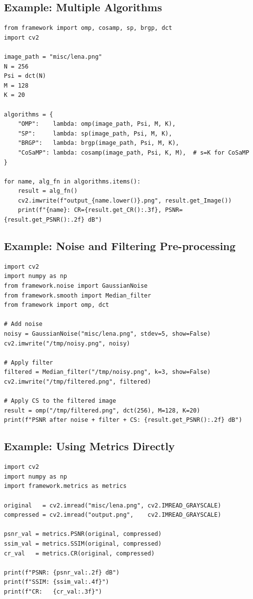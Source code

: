 \documentclass[12pt,a4paper]{article}
\begin{document}
\subsection{Example: Multiple Algorithms}

\begin{lstlisting}[style=python]
from framework import omp, cosamp, sp, brgp, dct
import cv2

image_path = "misc/lena.png"
N = 256
Psi = dct(N)
M = 128
K = 20

algorithms = {
    "OMP":    lambda: omp(image_path, Psi, M, K),
    "SP":     lambda: sp(image_path, Psi, M, K),
    "BRGP":   lambda: brgp(image_path, Psi, M, K),
    "CoSaMP": lambda: cosamp(image_path, Psi, K, M),  # s=K for CoSaMP
}

for name, alg_fn in algorithms.items():
    result = alg_fn()
    cv2.imwrite(f"output_{name.lower()}.png", result.get_Image())
    print(f"{name}: CR={result.get_CR():.3f}, PSNR={result.get_PSNR():.2f} dB")
\end{lstlisting}

\subsection{Example: Noise and Filtering Pre-processing}

\begin{lstlisting}[style=python]
import cv2
import numpy as np
from framework.noise import GaussianNoise
from framework.smooth import Median_filter
from framework import omp, dct

# Add noise
noisy = GaussianNoise("misc/lena.png", stdev=5, show=False)
cv2.imwrite("/tmp/noisy.png", noisy)

# Apply filter
filtered = Median_filter("/tmp/noisy.png", k=3, show=False)
cv2.imwrite("/tmp/filtered.png", filtered)

# Apply CS to the filtered image
result = omp("/tmp/filtered.png", dct(256), M=128, K=20)
print(f"PSNR after noise + filter + CS: {result.get_PSNR():.2f} dB")
\end{lstlisting}

\subsection{Example: Using Metrics Directly}

\begin{lstlisting}[style=python]
import cv2
import numpy as np
import framework.metrics as metrics

original   = cv2.imread("misc/lena.png", cv2.IMREAD_GRAYSCALE)
compressed = cv2.imread("output.png",    cv2.IMREAD_GRAYSCALE)

psnr_val = metrics.PSNR(original, compressed)
ssim_val = metrics.SSIM(original, compressed)
cr_val   = metrics.CR(original, compressed)

print(f"PSNR: {psnr_val:.2f} dB")
print(f"SSIM: {ssim_val:.4f}")
print(f"CR:   {cr_val:.3f}")
\end{lstlisting}
\end{document}
